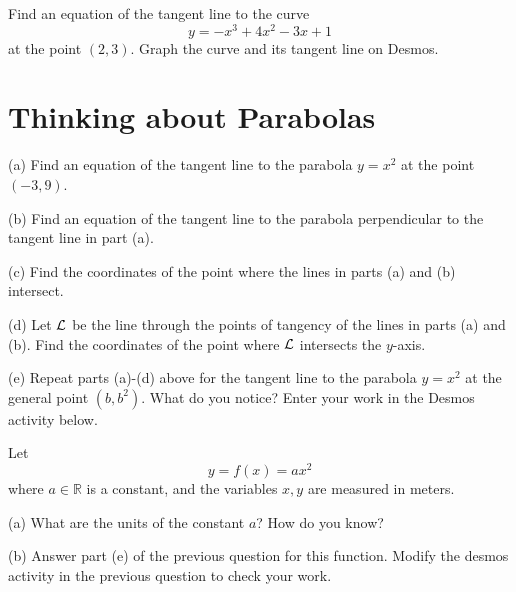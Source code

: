 \documentclass{ximera}
\begin{document}
\begin{question}  \label{Qdsfsdfre}
Find an equation of the tangent line to the curve
\[
      y = -x^3 + 4x^2 -3x + 1
\] 
at the point $(2,3)$. Graph the curve and its tangent line on Desmos. 
\end{question}


\section*{Thinking about Parabolas}

\begin{question} \label{Qsdfsdfgg}
(a) Find an equation of the tangent line to the parabola $y=x^2$ at the point $(-3,9)$.

(b) Find an equation of the tangent line to the parabola perpendicular to the tangent line in part (a).

(c) Find the coordinates of the point where the lines in parts (a) and (b) intersect.

(d) Let ${\cal L}$ be the line through the points of tangency of the lines in parts (a) and (b). Find the coordinates of the point where ${\cal L}$ intersects the $y$-axis.

(e) Repeat parts (a)-(d) above for the tangent line to the parabola $y=x^2$ at the general point $(b,b^2)$. What do you notice? Enter your work in the Desmos activity below.

 
\begin{onlineOnly}
    \begin{center}
\end{center}
\end{onlineOnly}


\end{question}

\begin{question}  \label{Qerdfggg}
Let
\[
     y = f(x) = a x^2
\]
where $a\in \mathbb{R}$ is a constant, and the variables $x, y$ are measured in meters.

(a) What are the units of the constant $a$? How do you know?

(b) Answer part (e) of the previous question for this function. Modify the desmos activity in the previous question to check your work.
\end{question}
\end{document}
